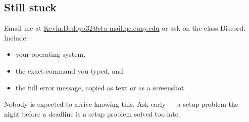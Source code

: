 \documentclass[11pt]{article}
\begin{document}
\subsection{Still stuck}
Email me at \url{Kevin.Bedoya32@stu-mail.qc.cuny.edu} or ask on the class
Discord. Include:

\begin{itemize}[leftmargin=1.4em,itemsep=2pt,topsep=3pt]
  \item your operating system,
  \item the exact command you typed, and
  \item the full error message, copied as text or as a screenshot.
\end{itemize}

\noindent Nobody is expected to arrive knowing this. Ask early --- a setup
problem the night before a deadline is a setup problem solved too late.
\end{document}
